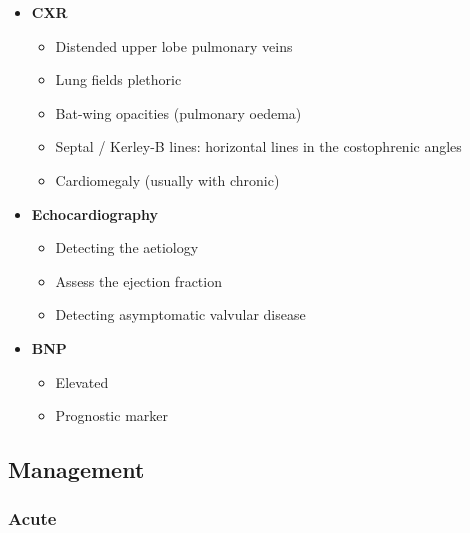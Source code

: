 \documentclass[
  12pt,
]{memoir}
\providecommand{\tightlist}{%
  \setlength{\itemsep}{0pt}\setlength{\parskip}{0pt}}
\begin{document}
\begin{itemize}
\tightlist
\item
  \textbf{CXR}

  \begin{itemize}
  \tightlist
  \item
    Distended upper lobe pulmonary veins
  \item
    Lung fields plethoric
  \item
    Bat-wing opacities (pulmonary oedema)
  \item
    Septal / Kerley-B lines: horizontal lines in the costophrenic angles
  \item
    Cardiomegaly (usually with chronic)
  \end{itemize}
\item
  \textbf{Echocardiography}

  \begin{itemize}
  \tightlist
  \item
    Detecting the aetiology
  \item
    Assess the ejection fraction
  \item
    Detecting asymptomatic valvular disease
  \end{itemize}
\item
  \textbf{BNP}

  \begin{itemize}
  \tightlist
  \item
    Elevated
  \item
    Prognostic marker
  \end{itemize}
\end{itemize}

\hypertarget{management-3}{%
\subsection{Management}\label{management-3}}

\hypertarget{acute}{%
\subsubsection{Acute}\label{acute}}
\end{document}

